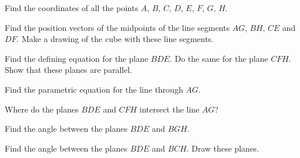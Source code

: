 \begin{multicols}{2}
\subprob Find the coordinates of all the points $A$, $B$, $C$, $D$,
$E$, $F$, $G$, $H$.

\subprob Find the position vectors of the midpoints of the line
segments $AG$, $BH$, $CE$ and $DF$. Make a drawing of the cube with
these line segments.

\subprob Find the defining equation for the plane $BDE$. Do the same
for the plane $CFH$. Show that these planes are parallel.

\subprob Find the parametric equation for the line through $AG$.

\subprob Where do the planes $BDE$ and $CFH$ intersect the line $AG$?

\subprob Find the angle between the planes $BDE$ and $BGH$.

\subprob Find the angle between the planes $BDE$ and $BCH$. Draw these
planes.

\end{multicols}
\noproblemfont






